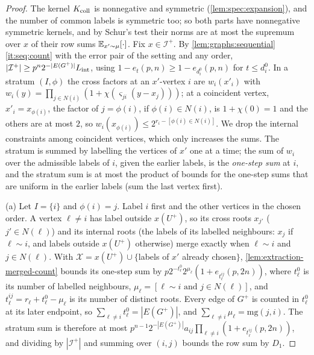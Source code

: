 \begin{proof}
The kernel $K_{\rm coll}$ is nonnegative and symmetric (\cref{lem:spec:expansion}),
and the number of common labels is symmetric too; so both parts have nonnegative
symmetric kernels, and by Schur's test their norms are
at most the supremum over $x$ of their row sums $\mathbb E_{x'\sim\mu}[\cdot]$. Fix
$x\in\mathcal I^+$. By \cref{lem:graphs:sequential}\ref{it:seq:count} with the error
pair of the setting and any order, $|\mathcal I^+|\ge p^n2^{-|E(G^+)|}L_{\rm int}$, using
$1-e_{t}(p,n)\ge1-e_{d^0_i}(p,n)$ for $t\le d^0_i$. In a stratum $(I,\phi)$ the
cross factors at an $x'$-vertex $i$ are $w_i(x'_i)$ with
$w_i(y)=\prod_{j\in N(i)}(1+\chi(\varsigma_{ji}(y-x_j)))$; at a coincident vertex,
$x'_i=x_{\phi(i)}$, the factor of $j=\phi(i)$, if $\phi(i)\in N(i)$, is $1+\chi(0)=1$
and the others are at most $2$, so $w_i(x_{\phi(i)})\le2^{r_i-[\phi(i)\in N(i)]}$.
We drop the internal constraints among coincident vertices, which only increases
the sums. The stratum is summed by labelling the vertices of $x'$ one at a time;
the sum of $w_i$ over the admissible labels of $i$, given the earlier labels, is
the \emph{one-step sum} at $i$, and the stratum sum is at most the product of
bounds for the one-step sums that are uniform in the earlier labels (sum the
last vertex first).

(a) Let $I=\{i\}$ and $\phi(i)=j$. Label $i$ first and the other vertices in the
chosen order. A vertex $\ell\ne i$ has label outside $x(U^+)$, so its cross roots
$x_{j'}$ ($j'\in N(\ell)$) and its internal roots (the labels of its labelled
neighbours: $x_j$ if $\ell\sim i$, and labels outside $x(U^+)$ otherwise) merge
exactly when $\ell\sim i$ and $j\in N(\ell)$. With $\mathcal X=x(U^+)\cup\{$labels
of $x'$ already chosen$\}$, \cref{lem:extraction-merged-count} bounds its one-step sum by
$p2^{-t^0_\ell}2^{\mu_\ell}(1+e_{t^{ij}_\ell}(p,2n))$, where $t^0_\ell$ is its number
of labelled neighbours, $\mu_\ell=[\ell\sim i\text{ and }j\in N(\ell)]$, and
$t^{ij}_\ell=r_\ell+t^0_\ell-\mu_\ell$ is its number of distinct roots. Every edge of
$G^+$ is counted in $t^0_\ell$ at its later endpoint, so $\sum_{\ell\ne
i}t^0_\ell=|E(G^+)|$, and $\sum_{\ell\ne i}\mu_\ell=\mathrm{mg}(j,i)$. The stratum sum
is therefore at most
$p^{n-1}2^{-|E(G^+)|}a_{ij}\prod_{\ell\ne i}(1+e_{t^{ij}_\ell}(p,2n))$, and dividing by
$|\mathcal I^+|$ and summing over $(i,j)$ bounds the row sum by $D_1$.


\end{proof}
